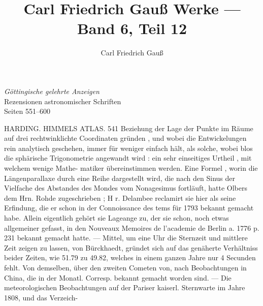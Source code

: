 \documentclass[12pt,a4paper]{article}
\begin{document}
\title{Carl Friedrich Gau\ss{} Werke --- Band 6, Teil 12}
\author{Carl Friedrich Gau\ss{}}
\date{}
\maketitle

\thispagestyle{empty}
\vfill
\begin{center}
\textit{G\"ottingische gelehrte Anzeigen}\\[0.5em]
Rezensionen astronomischer Schriften\\[0.5em]
Seiten 551--600
\end{center}
\vfill
\newpage

HARDING. HIMMELS ATLAS. 541\newline
Beziehung der Lage der Punkte im Räume auf drei rechtwinklichte Coordinaten gründen , und wobei\newline
die Entwickelungen rein analytisch geschehen, immer für weniger einfach hält, als solche, wobei blos\newline
die sphärische Trigonometrie angewandt wird : ein sehr einseitiges Urtheil , mit welchem wenige Mathe-\newline
matiker übereinstimmen werden. Eine Formel , worin die Längenparallaxe durch eine Reihe dargestellt\newline
wird, die nach den Sinus der Vielfache des Abstandes des Mondes vom Nonagesimus fortläuft, hatte\newline
Olbers dem Hrn. Rohde zugeschrieben ; H r. Delambee reclamirt sie hier als seine Erfindung, die er schon\newline
in der Connoissance des tems für 1793 bekannt gemacht habe. Allein eigentlich gehört sie Lageange\newline
zu, der sie schon, noch etwas allgemeiner gefasst, in den Nouveaux Memoires de l'academie de Berlin\newline
a. 1776 p. 231 bekannt gemacht hatte. --- Mittel, um eine Uhr die Sternzeit und mittlere Zeit zeigen\newline
zu lassen, von Bürckhaedt, gründet sich auf das genäherte Verhältniss beider Zeiten, wie 51.79 zu 49.82,\newline
welches in einem ganzen Jahre nur 4 Secunden fehlt. Von demselben, über den zweiten Cometen von, nach Beobachtungen in China, die in der Monatl. Corresp. bekannt gemacht worden sind. --- Die\newline
meteorologischen Beobachtungen auf der Pariser kaiserl. Sternwarte im Jahre 1808, und das Verzeich-\newline
\end{document}
